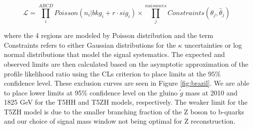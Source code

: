 \begin{equation}
\mathcal{L}=\prod^{ABCD}_{i} Poisson\left(n_i \vert bkg_i + r\cdot sig_i\right) \times \prod^{nuisances}_j Constraints\left(\theta_j , \hat{\theta}_j\right)
\end{equation}

where the 4 regions are modeled by Poisson distribution and the term Constraints refers to either Gaussian distributions for the $\kappa$ uncertainties or log normal distributions that model the signal systematics. The expected and observed limits are then calculated based on the asymptotic approximation of the profile likelihood ratio using the CLs criterion to place limits at the $95\%$ confidence level. These exclusion curves are seen in Figure \ref{fig:brazil}. We are able to place lower limits at 95\% confidence level on the gluino $\tilde{g}$ mass at 2010 and 1825 GeV for the T5HH and T5ZH models, respectively. The weaker limit for the T5ZH model is due to the smaller branching fraction of the Z boson to b-quarks and our choice of signal mass window not being optimal for Z reconstruction.

